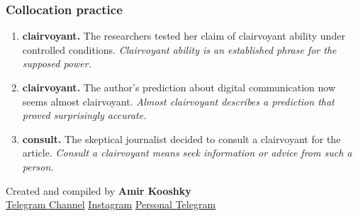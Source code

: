 \documentclass[11pt]{article}
\begin{document}
\subsubsection{Collocation practice}
\begin{enumerate}
  \item \textbf{clairvoyant.} The researchers tested her claim of clairvoyant ability under controlled conditions. \emph{Clairvoyant ability is an established phrase for the supposed power.}
  \item \textbf{clairvoyant.} The author's prediction about digital communication now seems almost clairvoyant. \emph{Almost clairvoyant describes a prediction that proved surprisingly accurate.}
  \item \textbf{consult.} The skeptical journalist decided to consult a clairvoyant for the article. \emph{Consult a clairvoyant means seek information or advice from such a person.}
\end{enumerate}

\vfill
\begin{center}
\small\color{Muted} Created and compiled by \textbf{Amir Kooshky}\\
\href{https://t.me/KooshkyTOEFL}{Telegram Channel}\quad\textbullet\quad
\href{https://www.instagram.com/kooshkytoefl}{Instagram}\quad\textbullet\quad
\href{https://t.me/KooshkyTOEFL\_pv}{Personal Telegram}
\end{center}
\end{document}
